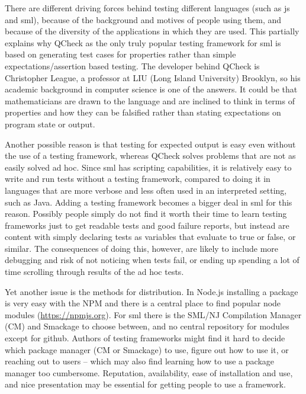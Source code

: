 \documentclass[11pt]{article}
\begin{document}
There are different driving forces behind testing different languages (such as \gls{js} and \gls{sml}), because of the background and motives of people using them, and because of the diversity of the applications in which they are used. This partially explains why QCheck as the only truly popular testing framework for \gls{sml} is based on generating test cases for properties rather than simple expectations/assertion based testing. The developer behind QCheck is Christopher League, a professor at LIU (Long Island University) Brooklyn, so his academic background in computer science is one of the answers. It could be that mathematicians are drawn to the language and are inclined to think in terms of properties and how they can be falsified rather than stating expectations on program state or output.

Another possible reason is that testing for expected output is easy even without the use of a testing framework, whereas QCheck solves problems that are not as easily solved ad hoc. Since \gls{sml} has scripting capabilities, it is relatively easy to write and run tests without a testing framework, compared to doing it in languages that are more verbose and less often used in an interpreted setting, such as Java. Adding a testing framework becomes a bigger deal in \gls{sml} for this reason. Possibly people simply do not find it worth their time to learn testing frameworks just to get readable tests and good failure reports, but instead are content with simply declaring tests as variables that evaluate to true or false, or similar. The consequences of doing this, however, are likely to include more debugging and risk of not noticing when tests fail, or ending up spending a lot of time scrolling through results of the ad hoc tests.

Yet another issue is the methods for distribution. In Node.js installing a package is very easy with the NPM and there is a central place to find popular node modules (\url{https://npmjs.org}). For \gls{sml} there is the SML/NJ Compilation Manager (CM) and Smackage to choose between, and no central repository for modules except for github. Authors of testing frameworks might find it hard to decide which package manager (CM or Smackage) to use, figure out how to use it, or reaching out to users -- which may also find learning how to use a package manager too cumbersome. Reputation, availability, ease of installation and use, and nice presentation may be essential for getting people to use a framework. %
\end{document}

